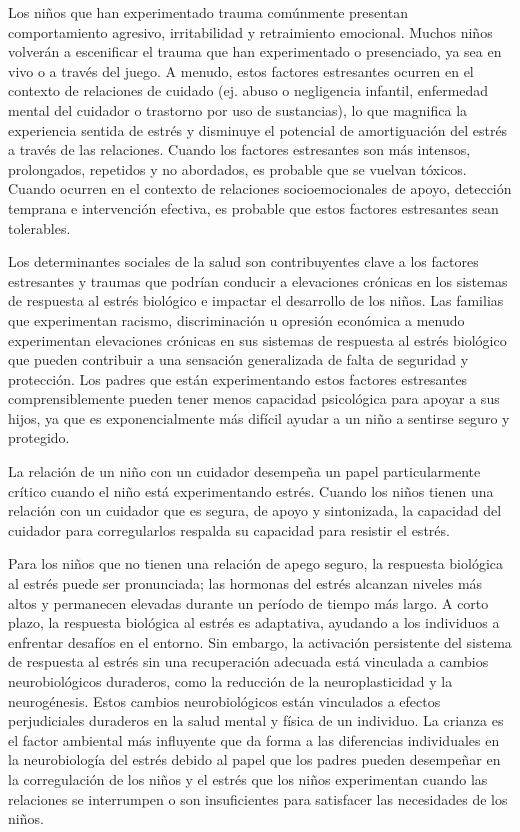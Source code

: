 \documentclass[11pt,letterpaper]{report}
\begin{document}
Los niños que han experimentado trauma comúnmente presentan comportamiento
agresivo, irritabilidad y retraimiento emocional. Muchos niños volverán a
escenificar el trauma que han experimentado o presenciado, ya sea en vivo o a
través del juego. A menudo, estos factores estresantes ocurren en el contexto
de relaciones de cuidado (ej. abuso o negligencia infantil, enfermedad mental
del cuidador o trastorno por uso de sustancias), lo que magnifica la
experiencia sentida de estrés y disminuye el potencial de amortiguación del
estrés a través de las relaciones. Cuando los factores estresantes son más
intensos, prolongados, repetidos y no abordados, es probable que se vuelvan
tóxicos. Cuando ocurren en el contexto de relaciones socioemocionales de apoyo,
detección temprana e intervención efectiva, es probable que estos factores
estresantes sean tolerables. \cite{Feldman3}

Los determinantes sociales de la salud son contribuyentes clave a los factores
estresantes y traumas que podrían conducir a elevaciones crónicas en los
sistemas de respuesta al estrés biológico e impactar el desarrollo de los
niños. Las familias que experimentan racismo, discriminación u opresión
económica a menudo experimentan elevaciones crónicas en sus sistemas de
respuesta al estrés biológico que pueden contribuir a una sensación
generalizada de falta de seguridad y protección. Los padres que están
experimentando estos factores estresantes comprensiblemente pueden tener menos
capacidad psicológica para apoyar a sus hijos, ya que es exponencialmente más
difícil ayudar a un niño a sentirse seguro y protegido. \cite{Feldman3}

La relación de un niño con un cuidador desempeña un papel particularmente
crítico cuando el niño está experimentando estrés. Cuando los niños tienen una
relación con un cuidador que es segura, de apoyo y sintonizada, la capacidad
del cuidador para corregularlos respalda su capacidad para resistir el estrés.
\cite{Feldman3}

Para los niños que no tienen una relación de apego seguro, la respuesta
biológica al estrés puede ser pronunciada; las hormonas del estrés alcanzan
niveles más altos y permanecen elevadas durante un período de tiempo más largo.
A corto plazo, la respuesta biológica al estrés es adaptativa, ayudando a los
individuos a enfrentar desafíos en el entorno. Sin embargo, la activación
persistente del sistema de respuesta al estrés sin una recuperación adecuada
está vinculada a cambios neurobiológicos duraderos, como la reducción de la
neuroplasticidad y la neurogénesis. Estos cambios neurobiológicos están
vinculados a efectos perjudiciales duraderos en la salud mental y física de un
individuo. La crianza es el factor ambiental más influyente que da forma a las
diferencias individuales en la neurobiología del estrés debido al papel que los
padres pueden desempeñar en la corregulación de los niños y el estrés que los
niños experimentan cuando las relaciones se interrumpen o son insuficientes
para satisfacer las necesidades de los niños. \cite{Feldman3}
\end{document}
